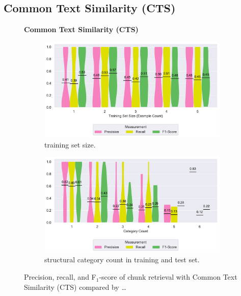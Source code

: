 \subsection{Common Text Similarity (CTS)}
\label{sec:r:cts}
\begin{figure}
\centering
    \textbf{Common Text Similarity (CTS)}\par\medskip
\begin{subfigure}[tb]{\columnwidth}
		\centering
		\includegraphics[width=\columnwidth,
		clip]{img/big-study/recall-precision-examplecount-CTS.pdf}
		\caption{training set size.}
		\label{fig:recall-precision-examplecount-CTS}

\end{subfigure}\hspace{\fill}
\begin{subfigure}[tb]{\columnwidth}
		\centering
				\includegraphics[width=\columnwidth,
				clip]{img/big-study/recall-precision-categorycount-CTS.pdf}
		\caption{structural category count
		in training and test set.}
		\label{fig:recall-precision-categorycount-CTS}
\end{subfigure}
\caption{Precision, recall, and F$_{1}$-score of chunk
retrieval with Common Text Similarity (CTS) compared by \ldots}
\end{figure}

